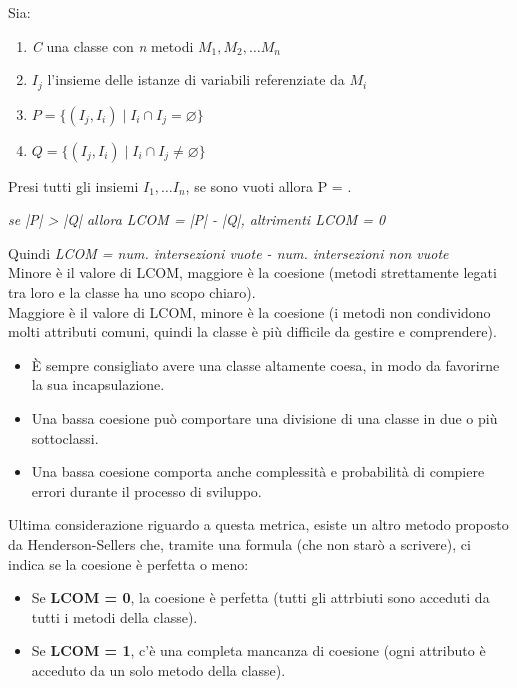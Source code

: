 {    Sia:
    \begin{enumerate}
        \item \textit{C} una classe con \textit{n} metodi \textit{\(M_1, M_2,\dots M_n\)}
        \item \textit{\(I_j\)} l'insieme delle istanze di variabili referenziate da \textit{\(M_i\)}
        \item \textit{\(P = \{(I_j, I_i) \mid I_i \cap I_j = \varnothing \}\)}
        \item \textit{\(Q = \{(I_j, I_i) \mid I_i \cap I_j \neq  \varnothing \}\)}
    \end{enumerate}
    Presi tutti gli insiemi \(I_1 , \dots I_n \), se sono vuoti allora P = \varnothing.
    \vspace{-0.1cm}
    \begin{center}
               \textit{se |P| > |Q| allora LCOM = |P| - |Q|, altrimenti LCOM = 0}
    \end{center}
    Quindi \textit{LCOM = num. intersezioni vuote - num. intersezioni non vuote}\\
    Minore è il valore di LCOM, maggiore è la coesione (metodi strettamente legati tra loro e la classe ha uno scopo chiaro).\\
    Maggiore è il valore di LCOM, minore è la coesione (i metodi non condividono molti attributi comuni, quindi la classe è
    più difficile da gestire e comprendere).
    \begin{itemize}
        \item \`E sempre consigliato avere una classe altamente coesa, in modo da favorirne la sua incapsulazione.
        \item Una bassa coesione può comportare una divisione di una classe in due o più sottoclassi.
        \item Una bassa coesione comporta anche complessità e probabilità di compiere errori durante il processo di sviluppo.
    \end{itemize}
    \newpage
    Ultima considerazione riguardo a questa metrica, esiste un altro metodo proposto da Henderson-Sellers che, tramite una formula
    (che non starò a scrivere), ci indica se la coesione è perfetta o meno:
    \begin{itemize}
        \item Se \textbf{LCOM = 0}, la coesione è perfetta (tutti gli attrbiuti sono acceduti da tutti i metodi della classe).
        \item Se \textbf{LCOM = 1}, c'è una completa mancanza di coesione (ogni attributo è acceduto da un solo metodo della classe).
    \end{itemize}

    \newpage
}
